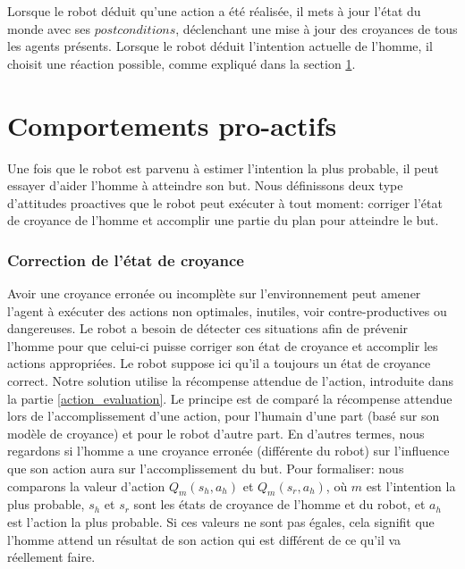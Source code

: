 \documentclass[a4paper,11pt,twoside]{StyleThese}
\begin{document}
Lorsque le robot déduit qu'une action a été réalisée, il mets à jour l'état du monde avec ses $postconditions$, déclenchant une mise à jour des croyances de tous les agents présents. Lorsque le robot déduit l'intention actuelle de l'homme, il choisit une réaction possible, comme expliqué dans la section \ref{sec:robot_reaction}.



\section{Comportements pro-actifs}
\label{sec:robot_reaction}

Une fois que le robot est parvenu à estimer l'intention la plus probable, il peut essayer d'aider l'homme à atteindre son but. Nous définissons deux type d'attitudes proactives que le robot peut exécuter à tout moment: corriger l'état de croyance de l'homme et accomplir une partie du plan pour atteindre le but.

\subsubsection{Correction de l'état de croyance}
Avoir une croyance erronée ou incomplète sur l'environnement peut amener l'agent à exécuter des actions non optimales, inutiles, voir contre-productives ou dangereuses. Le robot a besoin de détecter ces situations afin de prévenir l'homme pour que celui-ci puisse corriger son état de croyance et accomplir les actions appropriées. Le robot suppose ici qu'il a toujours un état de croyance correct. Notre solution utilise la récompense attendue de l'action, introduite dans la partie \ref{action_evaluation}. Le principe est de comparé la récompense attendue lors de l'accomplissement d'une action, pour l'humain d'une part (basé sur son modèle de croyance) et pour le robot d'autre part. En d'autres termes, nous regardons si l'homme a une croyance erronée (différente du robot) sur l'influence que son action aura sur l'accomplissement du but. Pour formaliser: nous comparons la valeur d'action \(Q_m(s_h,a_h)\) et \(Q_m(s_r,a_h)\), où $m$ est l'intention la plus probable, $s_h$ et $s_r$ sont les états de croyance de l'homme et du robot, et $a_h$ est l'action la plus probable. Si ces valeurs ne sont pas égales, cela signifit que l'homme attend un résultat de son action qui est différent de ce qu'il va réellement faire.
\end{document}
